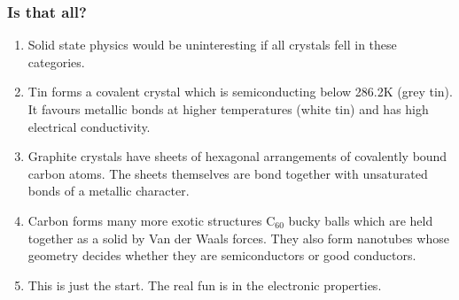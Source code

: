 \documentclass{beamer}
\begin{document}
\begin{frame}
\frametitle{Is that all?}
\begin{enumerate}
\item Solid state physics would be uninteresting if all crystals fell in these
categories.
\item Tin forms a covalent crystal which is semiconducting below 286.2K (grey
tin). It favours metallic bonds at higher temperatures (white tin) and has
high electrical conductivity.
\item Graphite crystals have sheets of hexagonal arrangements of covalently 
bound carbon atoms. The sheets themselves are bond together with unsaturated 
bonds of a metallic character.
\item Carbon forms many more exotic structures C$_{60}$ bucky balls which are
held together as a solid by Van der Waals forces. They also form nanotubes whose
geometry decides whether they are semiconductors or good conductors.
\item This is just the start. The real fun is in the electronic properties.
\end{enumerate}
\end{frame}
\end{document}
